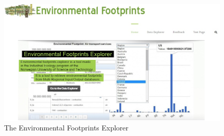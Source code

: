 \documentclass[12pt,letterpaper]{report}
\title{}
\begin{document}
\maketitle







\begin{figure}[h!]
\centering
\includegraphics[width=1.0\columnwidth]{figures/web1/web1.jpg}
\label{fig:startpage} The Environmental Footprints Explorer 
\end{figure}


%
%
%
%
%
%
%
%
%
%
%
%
%


%
%
%
%
%




%
%
%
%


\end{document}
